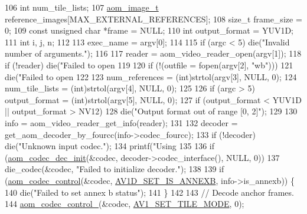 \begin{DoxyCodeInclude}
{106   \textcolor{keywordtype}{int} num\_tile\_lists;
107   \hyperlink{structaom__image}{aom\_image\_t} reference\_images[MAX\_EXTERNAL\_REFERENCES];
108   \textcolor{keywordtype}{size\_t} frame\_size = 0;
109   \textcolor{keyword}{const} \textcolor{keywordtype}{unsigned} \textcolor{keywordtype}{char} *frame = NULL;
110   \textcolor{keywordtype}{int} output\_format = YUV1D;
111   \textcolor{keywordtype}{int} i, j, n;
112 
113   exec\_name = argv[0];
114 
115   \textcolor{keywordflow}{if} (argc < 5) die(\textcolor{stringliteral}{"Invalid number of arguments."});
116 
117   reader = aom\_video\_reader\_open(argv[1]);
118   \textcolor{keywordflow}{if} (!reader) die(\textcolor{stringliteral}{"Failed to open %
119 
120   \textcolor{keywordflow}{if} (!(outfile = fopen(argv[2], \textcolor{stringliteral}{"wb"})))
121     die(\textcolor{stringliteral}{"Failed to open %
122 
123   num\_references = (int)strtol(argv[3], NULL, 0);
124   num\_tile\_lists = (int)strtol(argv[4], NULL, 0);
125 
126   \textcolor{keywordflow}{if} (argc > 5) output\_format = (int)strtol(argv[5], NULL, 0);
127   \textcolor{keywordflow}{if} (output\_format < YUV1D || output\_format > NV12)
128     die(\textcolor{stringliteral}{"Output format out of range [0, 2]"});
129 
130   info = aom\_video\_reader\_get\_info(reader);
131 
132   decoder = get\_aom\_decoder\_by\_fourcc(info->codec\_fourcc);
133   \textcolor{keywordflow}{if} (!decoder) die(\textcolor{stringliteral}{"Unknown input codec."});
134   printf(\textcolor{stringliteral}{"Using %
135 
136   \textcolor{keywordflow}{if} (\hyperlink{group__decoder_gafdbfca65b19ab1f6d72b32cd01753b9b}{aom\_codec\_dec\_init}(&codec, decoder->codec\_interface(), NULL, 0))
137     die\_codec(&codec, \textcolor{stringliteral}{"Failed to initialize decoder."});
138 
139   \textcolor{keywordflow}{if} (\hyperlink{group__codec_ga6da974f4eeaba1fa74106b28d0fe6ac5}{aom\_codec\_control}(&codec, \hyperlink{group__aom__decoder_gga3865fd4b3192489baa9a5c3632ebe97ba1fb269c5c5913d9995b6c35d28e2a788}{AV1D\_SET\_IS\_ANNEXB}, info->is\_annexb)) \{
140     die(\textcolor{stringliteral}{"Failed to set annex b status"});
141   \}
142 
143   \textcolor{comment}{// Decode anchor frames.}
144   \hyperlink{group__codec_ga51eb332a40dcacc39000ab8e0be36b79}{aom\_codec\_control\_}(&codec, \hyperlink{group__aom__decoder_gga3865fd4b3192489baa9a5c3632ebe97ba0795d8084ae8c78528c01587198df9e2}{AV1\_SET\_TILE\_MODE}, 0);
}}}}
\end{DoxyCodeInclude}
